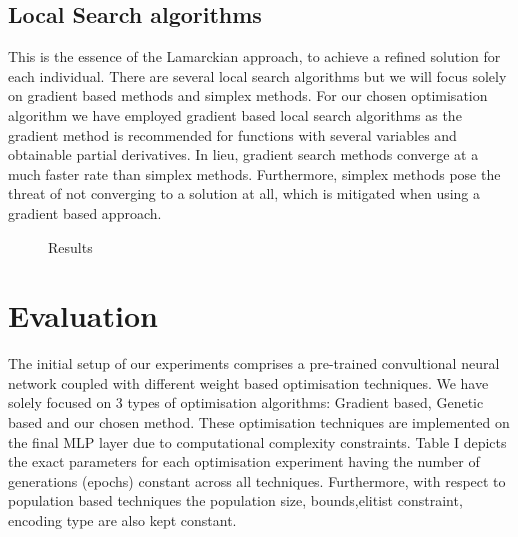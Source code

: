 \documentclass[conference]{IEEEtran}
\begin{document}
\subsection{Local Search algorithms}
This is the essence of the Lamarckian approach, to achieve a refined solution for each individual. There are several local search algorithms but we will focus solely on gradient based methods and simplex methods. For our chosen optimisation algorithm we have employed gradient based local search algorithms as the gradient method is recommended for functions with several variables and obtainable partial derivatives\cite{CERDA2016641}. In lieu,  gradient search methods converge at a much faster rate than simplex methods. Furthermore, simplex methods pose the threat of not converging to a solution at all, which is mitigated when using a gradient based approach.
\begin{figure}[!ht]

\centering{}
\caption {Results}
\label{fig:cnnj}
\end{figure}
\section{Evaluation}
The initial setup of our experiments comprises a pre-trained convultional neural network coupled with different weight based optimisation techniques. We have solely focused on 3 types of optimisation algorithms: Gradient based, Genetic based and our chosen method. These optimisation techniques are implemented on the final MLP layer due to computational complexity constraints. Table I depicts the exact parameters for each optimisation experiment having the number of generations (epochs) constant across all techniques. Furthermore, with respect to  population based techniques the  population size, bounds,elitist constraint, encoding type are also kept constant. 
\vspace{-4em}
\end{document}
